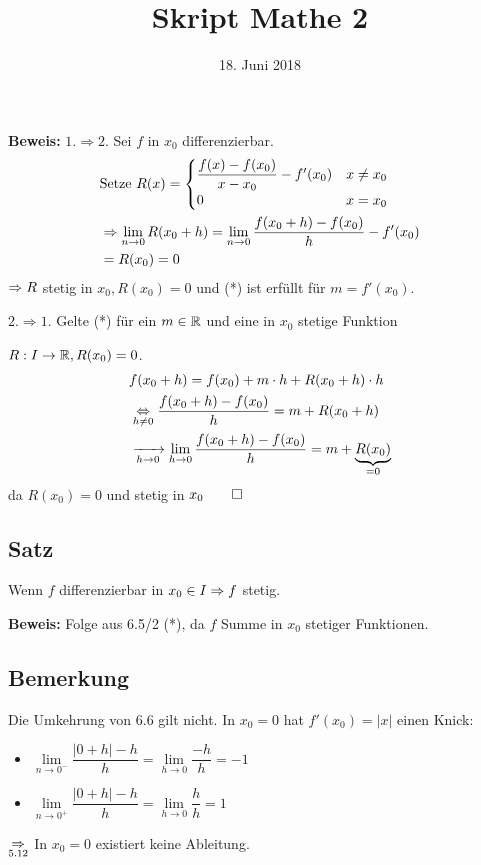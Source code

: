 \documentclass[10pt, a4paper, fleqn]{article}
\begin{document}
    \title{Skript Mathe 2}
    \date{18. Juni 2018}
    \maketitle
\fi
\textbf{Beweis: } $\boxed{1. \Rightarrow 2.}$ Sei $f$ in $x_0$ differenzierbar.
\[\begin{aligned}
    &\text{Setze } R(x) = \begin{cases}
        \dfrac{f(x) - f(x_0)}{x - x_0} - f'(x_0) & x \neq x_0 \\
        0 & x = x_0
    \end{cases} \\
    &\Rightarrow \lim_{n \to 0} R(x_0 + h) = \lim_{n \to 0} \frac{f(x_0 + h) - f(x_0)}{h} - f'(x_0) \\
    &= R(x_0) = 0
\end{aligned}\]
$\Rightarrow R$ stetig in $x_0, R(x_0) = 0$ und (*) ist erfüllt für $m = f'(x_0)$.
\bigskip

$\boxed{2. \Rightarrow 1.}$ Gelte (*) für ein $m \in \mathbb{R}$ und eine in $x_0$ stetige Funktion 

$R: I \to \mathbb{R}, R(x_0) = 0$.
\[\begin{aligned}
    &f(x_0 + h) = f(x_0) + m \cdot h + R(x_0 + h) \cdot h \\
    &\underset{h \neq 0}{\Leftrightarrow} \frac{f(x_0 + h) - f(x_0)}{h} = m + R(x_0 + h) \\
    &\xrightarrow[h \to 0]{} \lim_{h \to 0} \frac{f(x_0 + h) - f(x_0)}{h} = m + \underbrace{R(x_0)}_{= 0} \\
\end{aligned}\]
da $R(x_0) = 0$ und stetig in $x_0 \qed$

\subsection{Satz}
Wenn $f$ differenzierbar in $x_0 \in I \Rightarrow f$ stetig.

\textbf{Beweis: } Folge aus 6.5/2 (*), da $f$ Summe in $x_0$ stetiger Funktionen.

\subsection{Bemerkung}
Die Umkehrung von 6.6 gilt nicht. In $x_0 = 0$ hat $f'(x_0) = |x|$ einen Knick:
\begin{itemize}
    \item $\lim\limits_{n \to 0^-} \dfrac{|0 + h| - h}{h} = \lim\limits_{h \to 0} \dfrac{-h}{h} = -1$
    \item $\lim\limits_{n \to 0^+} \dfrac{|0 + h| - h}{h} = \lim\limits_{h \to 0} \dfrac{h}{h} = 1$
\end{itemize}
$\underset{5.12}{\Rightarrow}$ In $x_0 = 0$ existiert keine Ableitung.
\end{document}
